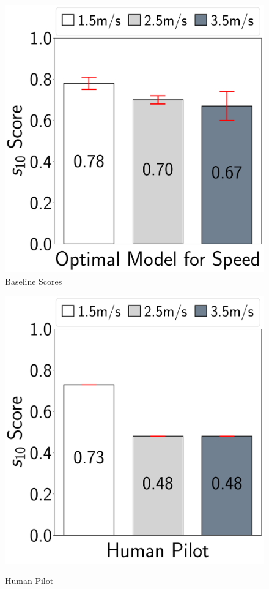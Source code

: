 \begin{figure}
\centering
\begin{minipage}{0.49\linewidth}
\centering
\includegraphics[width=1.0\linewidth]{chapter6/FIGS/fig-tracking-best.pdf}\\
\caption{Baseline Scores}
\label{fig:tracking-best}
\end{minipage}
\begin{minipage}{0.49\linewidth}
\centering
\includegraphics[width=1.0\linewidth]{chapter6/FIGS/fig-tracking-human.pdf}\\
\caption{Human Pilot}
\label{fig:tracking-human}
\end{minipage}
\end{figure}

